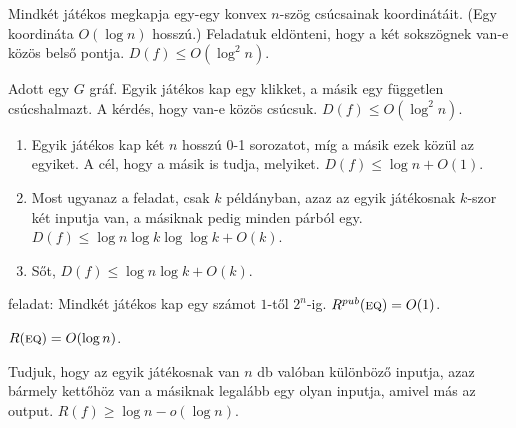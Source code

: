 \begin{Exercise}[counter={sorszam}, difficulty=0]
	Mindkét játékos megkapja egy-egy konvex $n$-szög csúcsainak koordinátáit. (Egy koordináta $O(\log n)$ hosszú.) Feladatuk eldönteni, hogy a két sokszögnek van-e közös belső pontja. $D(f)\leq O(\log^2 n )$.
	
\end{Exercise}


\begin{Exercise}[counter={sorszam}, difficulty=0]
	Adott egy $G$ gráf. Egyik játékos kap egy klikket, a másik egy független csúcshalmazt. A kérdés, hogy van-e közös csúcsuk. $D(f)\leq O(\log^2 n )$.
\end{Exercise}


\begin{Exercise}[counter={sorszam}, difficulty=0]
	\begin{enumerate}
		\item Egyik játékos kap két $n$ hosszú 0-1 sorozatot, míg a másik ezek közül az egyiket. A cél, hogy a másik is tudja, melyiket. $D(f)\leq \log n+O(1)$.
		\item \hard Most ugyanaz a feladat, csak $k$ példányban, azaz az egyik játékosnak $k$-szor két inputja van, a másiknak pedig minden párból egy. $D(f)\leq \log n \log k\log \log k+O(k)$.
		\item Sőt, $D(f)\leq \log n \log k+O(k)$.
	\end{enumerate}
\end{Exercise}


\begin{Exercise}[counter={sorszam}, difficulty=0]
	 feladat: Mindkét játékos kap egy számot $1$-től $2^n$-ig. $R^{pub}(\la{EQ})=O(1)$.
\end{Exercise}


\begin{Exercise}[counter={sorszam}, difficulty=0]
	$R(\la{EQ})=O(\log n)$.
\end{Exercise}


\begin{Exercise}[counter={sorszam}, difficulty=2]
	Tudjuk, hogy az egyik játékosnak van $n$ db valóban különböző inputja, azaz bármely kettőhöz van a másiknak legalább egy olyan inputja, amivel más az output. $R(f)\geq\log n -o(\log n)$.
\end{Exercise}


